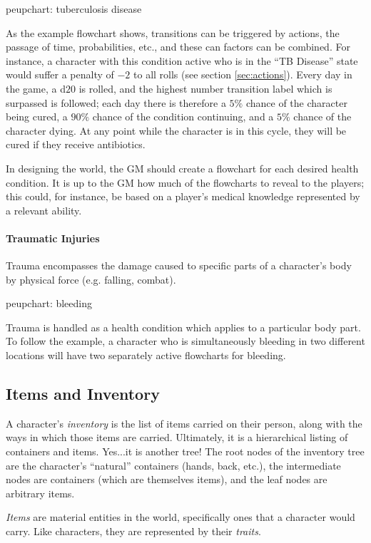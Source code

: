 \documentclass[12pt]{article}
\newcommand{\notes}[1]{{\color{Tan} #1}}
\newcommand{\emdex}[1]{\emph{#1}\index{#1}}
\begin{document}
\notes{peupchart: tuberculosis disease}

As the example flowchart shows, transitions can be triggered by actions, the passage of time, probabilities, etc., 
and these can factors can be combined. For instance, a character with this condition active who is in the ``TB Disease'' 
state would suffer a penalty of $-2$ to all rolls (see section \ref{sec:actions}). Every day in the game, a d$20$ is rolled, and the highest number 
transition label which is surpassed is followed; each day there is therefore a $5\%$ chance of the character being cured, a $90\%$ chance 
of the condition continuing, and a $5\%$ chance of the character dying. At any point while the character is in this cycle, 
they will be cured if they receive antibiotics.

In designing the world, the GM should create a flowchart for each desired health condition. It is up to the GM how much of the flowcharts 
to reveal to the players; this could, for instance, be based on a player's medical knowledge represented by a relevant ability.

\paragraph{Traumatic Injuries} Trauma encompasses the damage caused to specific parts of a character's body by physical force (e.g. falling, 
combat).

\notes{peupchart: bleeding}

Trauma is handled as a health condition which applies to a particular body part. To follow the example, a character who is simultaneously 
bleeding in two different locations will have two separately active flowcharts for bleeding.

\subsection{Items and Inventory} \label{sec:items}
A character's \emdex{inventory} is the list of items carried on their person,
along with the ways in which those items are carried.
Ultimately, it is a hierarchical listing of containers and items.
Yes...it is another tree!
The root nodes of the inventory tree are the character's ``natural'' containers (hands, back, etc.),
the intermediate nodes are containers (which are themselves items),
and the leaf nodes are arbitrary items.

\emph{Items} are material entities in the world, 
specifically ones that a character would carry.
Like characters, they are represented by their \emph{traits}.
\end{document}

